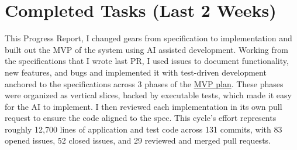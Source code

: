 \documentclass[12pt]{article}
\newcommand{\PRNumber}{3}
\newcommand{\RepoURL}{https://github.com/Ian-Costa18/Cybersecurity-Practicum/blob/progress-report-\PRNumber}
\begin{document}
\section*{Completed Tasks (Last 2 Weeks)}


This Progress Report, I changed gears from specification to implementation and built out the MVP of the system using AI assisted development. Working from the specifications that I wrote last PR, I used issues to document functionality, new features, and bugs and implemented it with test-driven development anchored to the specifications across 3 phases of the \href{\RepoURL/docs/mvp.md}{MVP plan}. These phases were organized as vertical slices, backed by executable tests, which made it easy for the AI to implement. I then reviewed each implementation in its own pull request to ensure the code aligned to the spec. This cycle's effort represents roughly 12,700 lines of application and test code across 131 commits, with 83 opened issues, 52 closed issues, and 29 reviewed and merged pull requests.
\end{document}
